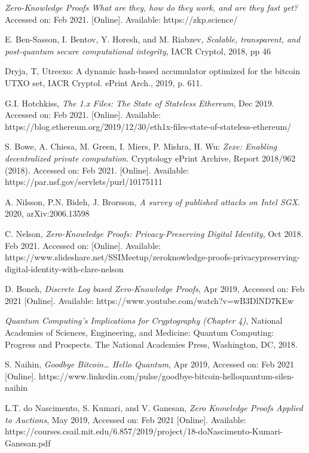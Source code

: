 \documentclass[peerreview]{ieeesyscoin}
\begin{document}
\begin{thebibliography}{00}
 \textit{Zero-Knowledge Proofs What are they, how do they work, and are they fast yet?} Accessed on: Feb 2021. [Online]. Available: https://zkp.science/

 E. Ben-Sasson, I. Bentov, Y. Horesh, and M. Riabzev, \textit{Scalable, transparent, and post-quantum secure computational integrity}, IACR Cryptol, 2018, pp 46 

 Dryja, T, Utreexo: A dynamic hash-based accumulator optimized for the bitcoin UTXO set, IACR Cryptol. ePrint Arch., 2019, p. 611.

 G.I. Hotchkiss, \textit{The 1.x Files: The State of Stateless Ethereum}, Dec 2019. Accessed on: Feb 2021. [Online]. Available:   https://blog.ethereum.org/2019/12/30/eth1x-files-state-of-stateless-ethereum/

 S. Bowe, A. Chiesa, M. Green, I. Miers, P. Mishra, H. Wu: \textit{Zexe: Enabling decentralized private computation}. Cryptology ePrint Archive, Report 2018/962 (2018). Accessed on: Feb 2021. [Online]. Available:  https://par.nsf.gov/servlets/purl/10175111

 A. Nilsson, P.N. Bideh, J. Brorsson, \textit{A survey of published attacks on Intel SGX}. 2020, arXiv:2006.13598

 C. Nelson, \textit{Zero-Knowledge Proofs: Privacy-Preserving Digital Identity}, Oct 2018. Feb 2021. Accessed on: [Online]. Available: https://www.slideshare.net/SSIMeetup/zeroknowledge-proofs-privacypreserving-digital-identity-with-clare-nelson

 D. Boneh, \textit{Discrete Log based Zero-Knowledge Proofs}, Apr 2019,  Accessed on: Feb 2021 [Online].  Available: https://www.youtube.com/watch?v=wB3DlND7KEw

 \textit{Quantum Computing’s Implications for Cryptography (Chapter 4)}, National Academies of Sciences, Engineering, and Medicine: Quantum Computing: Progress and Prospects. The National Academies Press, Washington, DC, 2018.

 S. Naihin, \textit{Goodbye Bitcoin… Hello Quantum}, Apr 2019, Accessed on: Feb 2021 [Online].   https://www.linkedin.com/pulse/goodbye-bitcoin-helloquantum-silen-naihin

 L.T. do Nascimento, S. Kumari, and V. Ganesan, \textit{Zero Knowledge Proofs Applied to Auctions}, May 2019, Accessed on: Feb 2021 [Online].   Available: https://courses.csail.mit.edu/6.857/2019/project/18-doNascimento-Kumari-Ganesan.pdf


\end{thebibliography}
\end{document}
